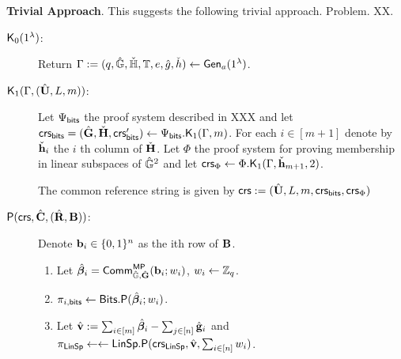 \textbf{Trivial Approach}.  This suggests the following trivial approach. Problem. XX.


\begin{description}
	
	\item[$\mathsf{K}_0(1^\lambda)$:]  Return $\Gamma := (q,{\hat{\mathbb{G}}},{\check{\mathbb{H}}},\mathbb{T},e,\hat{g},\check{h}) \leftarrow \mathsf{Gen}_a(1^{\lambda})$.
	
	\item[$\mathsf{K}_1(\Gamma, ({\hat{\mathbf{{U}}}},L,m))$:]
	Let $\Psi_{\mathsf{bits}}$ the proof system described in XXX and let $\mathsf{crs}_{\mathsf{bits}}=(\hat{\mathbf{{G}}},\check{\mathbf{{H}}},\mathsf{crs}'_{\mathsf{bits}})\gets\Psi_{\mathsf{bits}}.\mathsf{K}_1(\Gamma,m)$. For each $i\in[m+1]$ denote by $\check{\mathbf{h}}_i$ the $i$ th column of $\check{\mathbf{{H}}}$.
	Let $\Phi$ the proof system for proving membership in linear subspaces of ${\hat{\mathbb{G}}}^2$ and let $\mathsf{crs}_\Phi\gets\Phi.\mathsf{K}_1(\Gamma,\check{\mathbf{h}}_{m+1},2)$.
	
	The common reference string is given by $\mathsf{crs} := ({\hat{\mathbf{{U}}}},L,m,\mathsf{crs}_{\mathsf{bits}},\mathsf{crs}_\Phi)$
	
	\item[$\mathsf{P}(\mathsf{crs}, {\hat{\mathbf{{C}}}}, ({\hat{\mathbf{{R}}}},\mathbf{{B}}))$:] Denote $\mathbf{b}_{i}\in \{0,1\}^n$ as the ith row of 
	$\mathbf{{B}}$. \\
	\begin{enumerate}
		\item Let $\hat{{\boldsymbol \beta}}_i= \mathsf{Comm}_{{\hat{\mathbb{G}}},{\hat{\mathbf{{G}}}}}^{\mathsf{MP}}(\mathbf{b}_{i}; w_i)$, $w_i \gets \mathbb{Z}_q$.
		\item $\pi_{i,\mathsf{bits}} \gets \mathsf{Bits}.\mathsf{P}(\hat{{\boldsymbol \beta}}_i; w_i)$. 
		\item  Let ${\hat{\mathbf{{v}}}}:=\sum_{i\in[m]}\hat{{\boldsymbol \beta}}_i-\sum_{j\in[n]}\hat{\mathbf{g}}_i$ and  $\pi_{\mathsf{LinSp}} \gets \gets \mathsf{LinSp}.\mathsf{P}(\mathsf{crs}_{\mathsf{LinSp}},{\hat{\mathbf{{v}}}},\sum_{i \in [n]} w_{i})$.
		

\end{enumerate}
\end{description}
